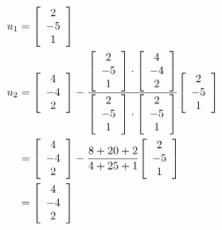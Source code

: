 \documentclass[11pt, a4paper, norsk]{NTNUoving}
\newenvironment{pkt}{\begin{punkt}}{\end{punkt}}
\newenvironment{matrise}[1][c]{
        \left[
            \begin{array}{#1}
    }
    {    
    \end{array}
    \right]           
}
\begin{document}
\begin{oppgave}
    \begin{pkt}
        \begin{align*}
            u_1&=\begin{matrise}
            2\\-5\\1
            \end{matrise}
            \\u_2&=\begin{matrise}
            4\\-4\\2
            \end{matrise}
            -\frac{\begin{matrise}
            2\\-5\\1
            \end{matrise} \cdot \begin{matrise}
            4\\-4\\2
            \end{matrise}}{\begin{matrise}
            2\\-5\\1
            \end{matrise} \cdot \begin{matrise}
            2\\-5\\1
            \end{matrise}}\begin{matrise}
            2\\-5\\1
            \end{matrise}
            \\&=\begin{matrise}
            4\\-4\\2
            \end{matrise}
            -\frac{8+20+2}{4+25+1}\begin{matrise}
            2\\-5\\1
            \end{matrise}
            \\&= \begin{matrise}
            4\\-4\\2
            \end{matrise}

\end{align*}
\end{pkt}
\end{oppgave}
\end{document}
